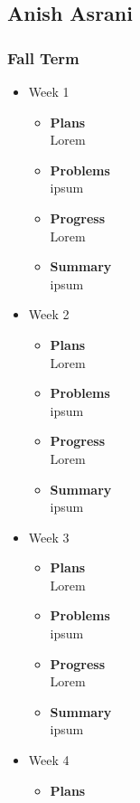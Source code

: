 	\pagebreak

	\subsection{Anish Asrani}
	\subsubsection{Fall Term}
	\begin{itemize}
		\item{Week 1}
			\begin{itemize}
				\item \textbf{Plans} \\
				Lorem
				\item \textbf{Problems} \\
				ipsum
				\item \textbf{Progress} \\
				Lorem
				\item \textbf{Summary} \\
				ipsum
			\end{itemize}
		\item{Week 2}
			\begin{itemize}
				\item \textbf{Plans} \\
				Lorem
				\item \textbf{Problems} \\
				ipsum
				\item \textbf{Progress} \\
				Lorem
				\item \textbf{Summary} \\
				ipsum
			\end{itemize}
		\item{Week 3}	
			\begin{itemize}
				\item \textbf{Plans} \\
				Lorem
				\item \textbf{Problems} \\
				ipsum
				\item \textbf{Progress} \\
				Lorem
				\item \textbf{Summary} \\
				ipsum
			\end{itemize}
		\item{Week 4}
			\begin{itemize}
				\item \textbf{Plans} \\

\end{itemize}
\end{itemize}
